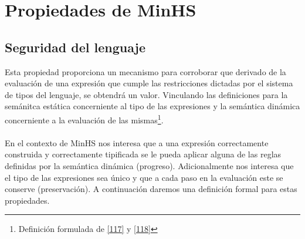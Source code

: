 \section{Propiedades de \textsf{MinHS}}

    \subsection{Seguridad del lenguaje}
        Esta propiedad  proporciona un mecanismo para corroborar que derivado de la evaluación de una expresión que cumple las restricciones dictadas por el sistema de tipos del lenguaje, se obtendrá un valor. Vinculando las definiciones para la semánitca estática concerniente al tipo de las expresiones y la semántica dinámica concerniente a la evaluación de las mismas\footnote{Definición formulada de \hyperlink{117}{[117]} y \hyperlink{118}{[118]}}.\\\\
En el contexto de \textsf{MinHS} nos interesa que a  una expresión correctamente construida y correctamente tipificada se le pueda aplicar alguna de las reglas definidas por la semántica dinámica (progreso). Adicionalmente nos interesa que el tipo de las expresiones sea único y que a cada paso en la evaluación este se conserve (preservación). A continuación daremos una definición formal para estas propiedades.
        
